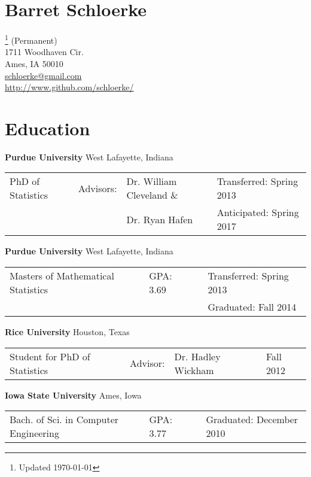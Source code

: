 \documentclass[oneside]{article}
\begin{document}
\section*{Barret Schloerke}  {\let\thefootnote\relax\footnote{Updated \today}}
(Permanent)\\
1711 Woodhaven Cir.\\
Ames, IA 50010 \\
\href{mailto:schloerke@gmail.com}{schloerke@gmail.com} \\
\url{http://www.github.com/schloerke/}

\section{Education}

\textbf{Purdue University} West Lafayette, Indiana

\begin{tabular}{p{1.75in}p{0.5in}p{1.50in}p{1.75in}}
PhD of Statistics & Advisors: & Dr. William Cleveland \& & Transferred: Spring 2013 \\
                  &           & Dr. Ryan Hafen & Anticipated: Spring 2017\\
\end{tabular}

\vspace{0.5em}

\textbf{Purdue University} West Lafayette, Indiana

\begin{tabular}{p{2.75in}p{0.75in}p{0.25in}p{1.75in}}
Masters of Mathematical Statistics & GPA: 3.69 & & Transferred: Spring 2013 \\
& & & Graduated: Fall 2014  \\
\end{tabular}

\vspace{0.5em}

\textbf{Rice University} Houston, Texas

\begin{tabular}{p{1.75in}p{0.5in}p{1.50in}p{1.75in}}
Student for PhD of Statistics &
Advisor: & Dr. Hadley Wickham &
Fall 2012
\end{tabular}

\vspace{0.5em}

\textbf{Iowa State University} Ames, Iowa

\begin{tabular}{p{2.75in}p{0.75in}p{0.25in}p{1.75in}}
Bach. of Sci. in Computer Engineering &
GPA: 3.77 & &
Graduated: December 2010
\end{tabular}
\end{document}
